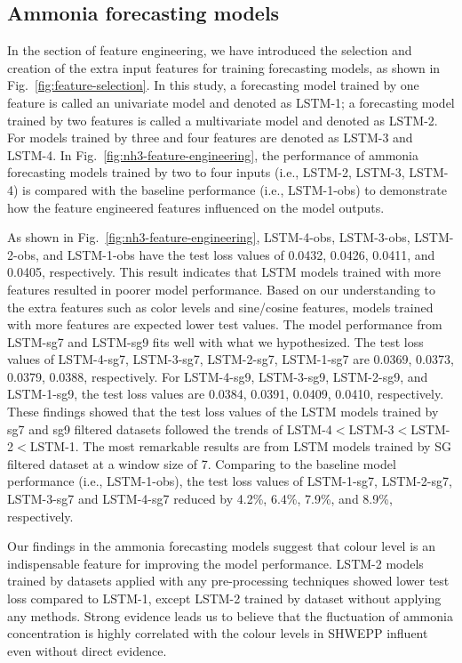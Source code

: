 \subsection{Ammonia forecasting models}
In the section of feature engineering, we have introduced the selection and creation of the extra input features for training forecasting models, as shown in Fig.~\ref{fig:feature-selection}. In this study, a forecasting model trained by one feature is called an univariate model and denoted as LSTM-1; a forecasting model trained by two features is called a multivariate model and denoted as LSTM-2. For models trained by three and four features are denoted as LSTM-3 and LSTM-4. In Fig.~\ref{fig:nh3-feature-engineering}, the performance of ammonia forecasting models trained by two to four inputs (i.e., LSTM-2, LSTM-3, LSTM-4) is compared with the baseline performance (i.e., LSTM-1-obs) to demonstrate how the feature engineered features influenced on the model outputs. 

As shown in Fig.~\ref{fig:nh3-feature-engineering}, LSTM-4-obs, LSTM-3-obs, LSTM-2-obs, and LSTM-1-obs have the test loss values of 0.0432, 0.0426, 0.0411, and 0.0405, respectively. This result indicates that LSTM models trained with more features resulted in poorer model performance. Based on our understanding to the extra features such as color levels and sine/cosine features, models trained with more features are expected lower test values. The model performance from LSTM-sg7 and LSTM-sg9 fits well with what we hypothesized. The test loss values of LSTM-4-sg7, LSTM-3-sg7, LSTM-2-sg7, LSTM-1-sg7 are 0.0369, 0.0373, 0.0379, 0.0388, respectively. For LSTM-4-sg9, LSTM-3-sg9, LSTM-2-sg9, and LSTM-1-sg9, the test loss values are 0.0384, 0.0391, 0.0409, 0.0410, respectively. These findings showed that the test loss values of the LSTM models trained by sg7 and sg9 filtered datasets followed the trends of LSTM-4$<$LSTM-3$<$LSTM-2$<$LSTM-1. The most remarkable results are from LSTM models trained by SG filtered dataset at a window size of 7. Comparing to the baseline model performance (i.e., LSTM-1-obs), the test loss values of LSTM-1-sg7, LSTM-2-sg7, LSTM-3-sg7 and LSTM-4-sg7 reduced by 4.2\%, 6.4\%, 7.9\%, and 8.9\%, respectively.

Our findings in the ammonia forecasting models suggest that colour level is an indispensable feature for improving the model performance. LSTM-2 models trained by datasets applied with any pre-processing techniques showed lower test loss compared to LSTM-1, except LSTM-2 trained by dataset without applying any methods. Strong evidence leads us to believe that the fluctuation of ammonia concentration is highly correlated with the colour levels in SHWEPP influent even without direct evidence.

